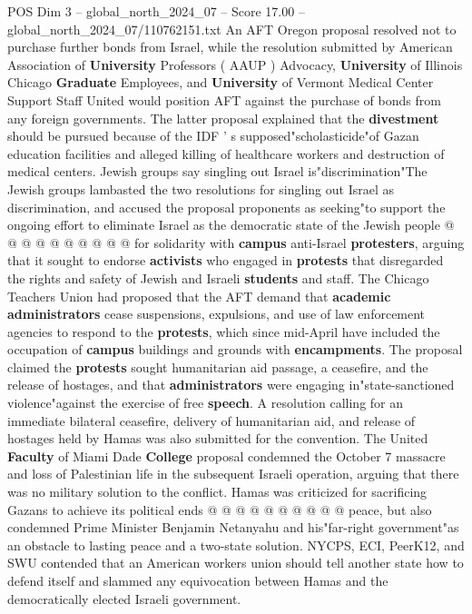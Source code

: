 \begin{textsample}{POS Dim 3 – global\_north\_2024\_07 – Score 17.00 – global\_north\_2024\_07/110762151.txt}
An AFT Oregon proposal resolved not to purchase further bonds from Israel, while the resolution submitted by American Association of \textbf{University} Professors ( AAUP ) Advocacy, \textbf{University} of Illinois Chicago \textbf{Graduate} Employees, and \textbf{University} of Vermont Medical Center Support Staff United would position AFT against the purchase of bonds from any foreign governments.
The latter proposal explained that the \textbf{divestment} should be pursued because of the IDF ' s supposed"scholasticide"of Gazan education facilities and alleged killing of healthcare workers and destruction of medical centers.
Jewish groups say singling out Israel is"discrimination"The Jewish groups lambasted the two resolutions for singling out Israel as discrimination, and accused the proposal proponents as seeking"to support the ongoing effort to eliminate Israel as the democratic state of the Jewish people @ @ @ @ @ @ @ @ @ @ for solidarity with \textbf{campus} anti-Israel \textbf{protesters}, arguing that it sought to endorse \textbf{activists} who engaged in \textbf{protests} that disregarded the rights and safety of Jewish and Israeli \textbf{students} and staff.
The Chicago Teachers Union had proposed that the AFT demand that \textbf{academic} \textbf{administrators} cease suspensions, expulsions, and use of law enforcement agencies to respond to the \textbf{protests}, which since mid-April have included the occupation of \textbf{campus} buildings and grounds with \textbf{encampments}.
The proposal claimed the \textbf{protests} sought humanitarian aid passage, a ceasefire, and the release of hostages, and that \textbf{administrators} were engaging in"state-sanctioned violence"against the exercise of free \textbf{speech}.
A resolution calling for an immediate bilateral ceasefire, delivery of humanitarian aid, and release of hostages held by Hamas was also submitted for the convention.
The United \textbf{Faculty} of Miami Dade \textbf{College} proposal condemned the October 7 massacre and loss of Palestinian life in the subsequent Israeli operation, arguing that there was no military solution to the conflict.
Hamas was criticized for sacrificing Gazans to achieve its political ends @ @ @ @ @ @ @ @ @ @ peace, but also condemned Prime Minister Benjamin Netanyahu and his"far-right government"as an obstacle to lasting peace and a two-state solution.
NYCPS, ECI, PeerK12, and SWU contended that an American workers union should tell another state how to defend itself and slammed any equivocation between Hamas and the democratically elected Israeli government.

\end{textsample}
